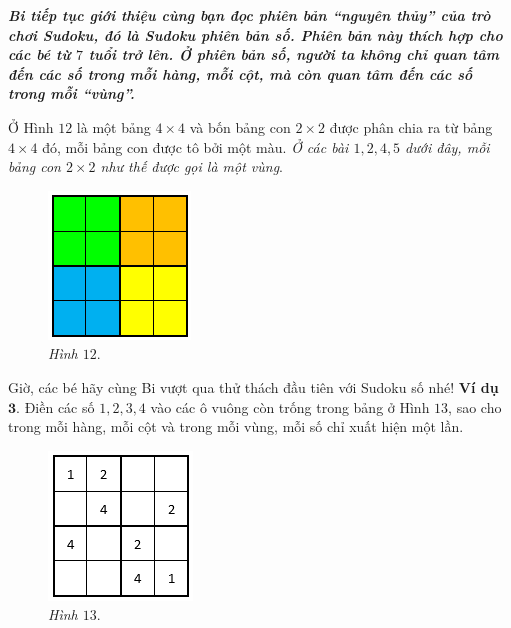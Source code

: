 	\graphicspath{{../suyluancungbi/sudoku2/}}
	\vskip 0.2cm
	\textit{\textbf{\color{toancuabi}Bi tiếp tục giới thiệu cùng bạn đọc phiên bản “nguyên thủy” của trò chơi Sudoku, đó là Sudoku phiên bản số. Phiên bản này thích hợp cho các bé từ $7$ tuổi trở lên.
	Ở phiên bản số, người ta không chỉ quan tâm đến các số trong mỗi hàng, mỗi cột, mà còn quan tâm đến các số trong mỗi “vùng”.}}
	\begin{multicols}{2}
		Ở Hình $12$ là một bảng $4\times4$ và bốn bảng con $2\times2$ được phân chia ra từ bảng $4\times4$ đó, mỗi bảng con được tô bởi một màu. \textit{Ở các bài $1, 2, 4, 5$ dưới đây, mỗi bảng con $2\times2$ như thế được gọi là một vùng}.
		\begin{figure}[H]
			\centering
			\vspace*{5pt}
			\captionsetup{labelformat= empty, justification=centering}
			\includegraphics[scale=0.8]{pic1}
			\caption{\small\textit{Hình $12.$}}
			\vspace*{-10pt}
		\end{figure}
	\end{multicols}
	\vspace*{-5pt}
	Giờ, các bé hãy cùng Bi vượt qua thử thách đầu tiên với Sudoku  số nhé!
	\vskip 0.1cm
	\textbf{\color{toancuabi}Ví dụ $\pmb{3.}$} Điền các số $1, 2, 3, 4$ vào các ô vuông còn trống trong bảng ở Hình $13$, sao cho trong mỗi hàng, mỗi cột và trong mỗi vùng, mỗi số chỉ xuất hiện một lần.
	\vskip 0.1cm
	\begin{figure}
		\centering
		\captionsetup{labelformat= empty, justification=centering}
		\includegraphics[scale=0.8]{pic2}
		\caption{\small\textit{Hình $13.$}}
		\vspace*{-10pt}
	\end{figure}
